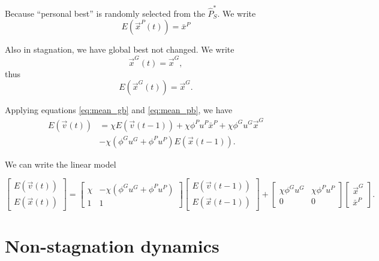\documentclass[12pt]{article}
\begin{document}
Because ``personal best'' is randomly selected from the $ \hat{P}^{*}_{S} $.
We write
\begin{equation}
\label{eq:mean_pb}
E (\vec{x}^{P}(t)) = \bar{x}^{P}
\end{equation}

Also in stagnation, we have global best not changed.
We write 
\begin{equation}
\vec{x}^{G}(t) = \vec{x}^{G},
\end{equation}
thus 
\begin{equation}
\label{eq:mean_gb}
E (\vec{x}^{G}(t)) = \vec{x}^{G}. 
\end{equation}

Applying equations \eqref{eq:mean_gb} and \eqref{eq:mean_pb}, we have
\begin{equation}
\begin{aligned}
E(\vec{v}(t)) & = \chi E(\vec{v}(t-1))  + \chi \phi^{P} u^{P} \bar{x}^{P} + \chi \phi^{G} u^{G} \vec{x}^{G} \\
& - \chi (\phi^{G} u^{G} + \phi^{P} u^{P} ) E(\vec{x}(t-1)). 
\end{aligned}
\end{equation}

We can write the linear model 

\begin{equation}
\begin{bmatrix}
E(\vec{v}(t))
\\ 
E(\vec{x}(t))
\end{bmatrix}
=
\begin{bmatrix}
\chi & - \chi (\phi^{G} u^{G} + \phi^{P} u^{P} )
\\ 
1 & 1
\end{bmatrix}
\begin{bmatrix}
E(\vec{v}(t-1))
\\ 
E(\vec{x}(t-1))
\end{bmatrix}
+ 
\begin{bmatrix}
\chi \phi^{G} u^{G} & \chi \phi^{P} u^{P}
\\ 
0 & 0
\end{bmatrix}
\begin{bmatrix}
\vec{x}^{G}
\\ 
\bar{x}^{P}
\end{bmatrix}.
\end{equation}


\section{Non-stagnation dynamics}



\end{document}
